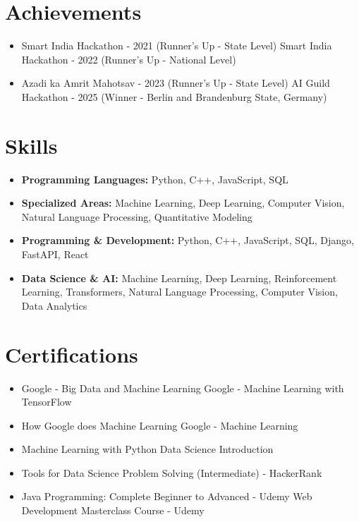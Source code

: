 \documentclass[a4paper,10pt]{article}
\begin{document}
\section*{Achievements}
\begin{itemize}
\item Smart India Hackathon - 2021 (Runner's Up - State Level) \hfill Smart India Hackathon - 2022 (Runner's Up - National Level)
\item Azadi ka Amrit Mahotsav - 2023 (Runner's Up - State Level) \hfill AI Guild Hackathon - 2025 (Winner - Berlin and Brandenburg State, Germany)
\end{itemize}

\section*{Skills}
\begin{itemize}
  \item \textbf{Programming Languages:} Python, C++, JavaScript, SQL
  \item \textbf{Specialized Areas:} Machine Learning, Deep Learning, Computer Vision, Natural Language Processing, Quantitative Modeling
  \item \textbf{Programming \& Development:} Python, C++, JavaScript, SQL, Django, FastAPI, React
  \item \textbf{Data Science \& AI:} Machine Learning, Deep Learning, Reinforcement Learning, Transformers, Natural Language Processing, Computer Vision, Data Analytics
\end{itemize}

\section*{Certifications}
\begin{itemize}
\item Google - Big Data and Machine Learning \hfill Google - Machine Learning with TensorFlow
\item How Google does Machine Learning \hfill Google - Machine Learning
\item Machine Learning with Python \hfill Data Science Introduction
\item Tools for Data Science \hfill Problem Solving (Intermediate) - HackerRank
\item Java Programming: Complete Beginner to Advanced - Udemy \hfill Web Development Masterclass Course - Udemy
\end{itemize}
\end{document}
